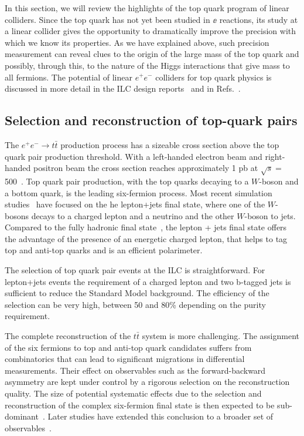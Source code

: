 



In this section, we will review the  highlights of the top quark
program of linear colliders.     Since the top quark has not yet been
studied in $\ee$  reactions,  its study at a linear collider gives the
opportunity to dramatically improve the precision with which we know
its properties.   As we have explained above, such precision
measurement can reveal clues to the origin of the large mass of the
top quark and possibly, through this, to the nature of the Higgs
interactions that give mass to all fermions.
The potential of linear $e^+e^-$ colliders for top quark physics is
discussed in more detail in the 
ILC design reports~\cite{Baer:2013cma,Behnke:2013lya}
and in Refs.~\cite{Agashe:2013hma,Vos:2016til,Abramowicz:2018rjq}.

\subsection{Selection and reconstruction of top-quark pairs}
\label{subsec:top:reco}

The $e^+e^- \rightarrow t\bar{t}$ production process has a sizeable cross section above
the top quark pair production threshold. With a left-handed electron beam and
right-handed positron beam the cross section reaches approximately 1 pb at 
$\sqrt{s}=$ 500~\GeV{}. Top quark pair production, with the top quarks decaying to a
$W$-boson and a bottom quark, is the leading six-fermion process. Most recent 
simulation studies~\cite{Amjad:2015mma,Bernreuther:2017cyi,Abramowicz:2018rjq}
have focused on the he lepton+jets final state, where one of the $W$-bosons decays 
to a charged lepton and a neutrino and the other $W$-boson to jets. Compared to the 
fully hadronic final state~\cite{Devetak:2010na}, the lepton + jets final state offers 
the advantage of the presence of an energetic charged lepton, that helps to tag top 
and anti-top quarks and is an efficient polarimeter.

The selection of top quark pair events at the ILC is straightforward. For lepton+jets
events the requirement of a charged lepton and two b-tagged jets is sufficient to reduce
the Standard Model background. The efficiency of the selection can be very high, 
between 50 and 80\% depending on the purity requirement. 

The complete reconstruction of the $t\bar{t}$ system is more
challenging. The assignment of the six fermions to top and anti-top quark candidates
suffers from combinatorics that can lead to significant migrations in differential
measurements. Their effect on observables such as the forward-backward asymmetry are 
kept under control by a rigorous selection on the reconstruction quality. 
The size of potential systematic effects due to the selection and reconstruction 
of the complex six-fermion final state is then expected to be
sub-dominant~\cite{Amjad:2015mma}. Later studies have extended this conclusion 
to a broader set of 
observables~\cite{Bernreuther:2017cyi,Durieux:2018tev, Abramowicz:2018rjq}. 

